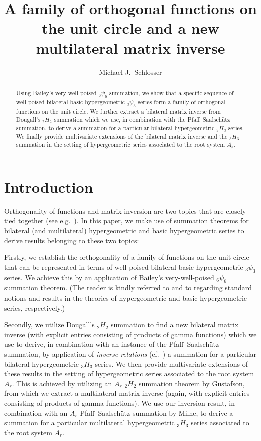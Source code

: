 \documentclass[reqno,12pt]{amsart}
\author{Michael J.\ Schlosser}
\title[Orthogonal functions and a multilateral matrix inverse]{A
  family of orthogonal functions on the
unit circle and a new multilateral matrix inverse}
\theoremstyle{remark}
\numberwithin{equation}{section}
\begin{document}
\begin{abstract}
Using Bailey's very-well-poised $_6\psi_6$ summation, we
show that a specific sequence of well-poised bilateral basic
hypergeometric $_3\psi_3$ series form a family of
orthogonal functions on the unit circle.
We further extract a bilateral matrix inverse from
Dougall's ${}_2H_2$ summation which we use,
in combination with the Pfaff--Saalsch\"utz summation,
to derive a summation for a particular bilateral
hypergeometric $_3H_3$ series.
We finally provide multivariate extensions of the bilateral
matrix inverse and the $_3H_3$ summation in the setting of
hypergeometric series associated to the root system $A_r$.
\end{abstract}

\maketitle

\section{Introduction}\label{sec:intro}
Orthogonality of functions and matrix inversion are two topics
that are closely tied together (see e.g.\ \cite{CK}).
In this paper, we make use of summation theorems for bilateral
(and multilateral) hypergeometric and basic hypergeometric
series to derive results belonging to these two topics:

Firstly, we establish the orthogonality of a family of functions on the unit
circle that can be represented in terms of well-poised bilateral basic
hypergeometric $_3\psi_3$ series.
We achieve this by an application of Bailey's very-well-poised
$_6\psi_6$ summation theorem. (The reader is kindly referred to \cite{Sl}
and to \cite{GR} regarding standard notions and results in the theories of
hypergeometric and basic hypergeometric series, respectively.)

Secondly, we utilize Dougall's ${}_2H_2$ summation
to find a new bilateral matrix inverse (with explicit entries
consisting of products of gamma functions) which we use to derive,
in combination with an instance of the Pfaff--Saalsch\"utz summation,
by application of \textit{inverse relations} (cf.\ \cite{R})
a summation for a particular bilateral hypergeometric $_3H_3$ series.
We then provide multivariate extensions of these results
in the setting of hypergeometric series associated to the root
system $A_r$. This is achieved by utilizing an $A_r$ $_2H_2$
summation theorem by Gustafson, from which we extract a multilateral
matrix inverse (again, with explicit entries
consisting of products of gamma functions). We use our inversion result,
in combination with an $A_r$ Pfaff--Saalsch\"utz summation by Milne,
to derive a summation for a particular multilateral
hypergeometric $_3H_3$ series associated to the root system $A_r$.
\end{document}
